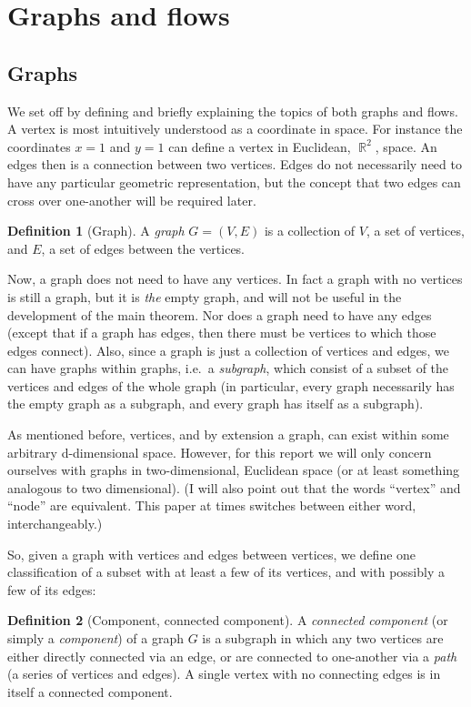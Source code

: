 \documentclass{amsart}
\DeclareMathOperator{\R}{\mathbb{R}}
\theoremstyle{plain}
\theoremstyle{remark}
\theoremstyle{definition}
\newtheorem*{definition*}{Definition}
\newenvironment{definition}%
  {\begin{leftbar}\begin{definition*}
}{%
  \end{definition*}\end{leftbar}
}
\begin{document}

\hrulefill

\section{Graphs and flows}

\subsection{Graphs}

We set off by defining and briefly explaining the topics of both graphs and
flows.
A vertex is most intuitively understood as a coordinate in space.
For instance the coordinates $x=1$ and $y=1$ can define a vertex in
Euclidean, $\R^2$, space.
An edges then is a connection between two vertices.
Edges do not necessarily need to have any particular geometric representation,
but the concept that two edges can cross over one-another will be required
later.
\begin{definition}[Graph]
  A \emph{graph} $G=(V,E)$ is a collection of $V$, a set of vertices, and $E$, a
  set of edges between the vertices.
\end{definition}

Now, a graph does not need to have any vertices.
In fact a graph with no vertices is still a graph, but it is \emph{the} empty
graph, and will not be useful in the development of the main theorem.
Nor does a graph need to have any edges (except that if a graph has edges,
then there must be vertices to which those edges connect).
Also, since a graph is just a collection of vertices and edges, we can have
graphs within graphs, i.e.\ a \emph{subgraph}, which consist of a subset of
the vertices and edges of the whole graph (in particular, every graph
necessarily has the empty graph as a subgraph, and every graph has itself as
a subgraph).

As mentioned before,
vertices, and by extension a graph, can exist within some arbitrary
d-dimensional space. However, for this report we will only concern ourselves
with graphs in two-dimensional, Euclidean space (or at least something
analogous to two dimensional).
(I will also point out that the words ``vertex'' and ``node'' are equivalent.
This paper at times switches between either word, interchangeably.)

So, given a graph with vertices and edges between vertices, we define one
classification of a subset with at least a few of its vertices, and with
possibly a few of its edges:
\begin{definition}[Component, connected component]
  A \emph{connected component} (or simply a \emph{component}) of a graph $G$ is
  a subgraph in which any two
  vertices are either directly connected via an edge, or are connected to
  one-another via a \emph{path} (a series of vertices and edges). A single
  vertex with no connecting edges is in itself a connected component.
\end{definition}
\end{document}
